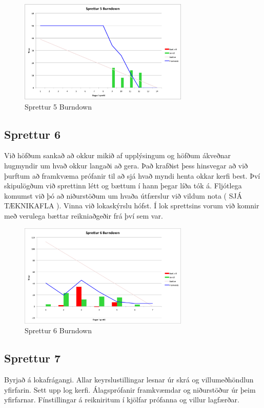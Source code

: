 \documentclass{article}
\begin{document}
\begin{figure}[H]
 \centering
 \includegraphics[width=0.72\textwidth]{Sprettur5_Burndown.png}
 \caption{Sprettur 5 Burndown}
\end{figure}

\subsection{Sprettur 6}
Við höfðum sankað að okkur mikið af upplýsingum og höfðum ákveðnar hugmyndir um hvað okkur langaði að gera. Það krafðist þess hinsvegar að við 
þurftum að framkvæma prófanir til að sjá hvað myndi henta okkar kerfi best. Því skipulögðum við sprettinn létt og bættum í hann þegar líða tók á. 
Fljótlega komumst við þó að niðurstöðum um hvaða útfærslur við vildum nota ( SJÁ TÆKNIKAFLA ). Vinna við lokaskýrslu hófst. Í lok sprettsins 
vorum við komnir með verulega bættar reikniaðgeðir frá því sem var.

\begin{figure}[H]
 \centering
 \includegraphics[width=0.72\textwidth]{Sprettur6_Burndown.png}
 \caption{Sprettur 6 Burndown}
\end{figure}

\subsection{Sprettur 7}
Byrjað á lokafrágangi. Allar keyrslustillingar lesnar úr skrá og villumeðhöndlun yfirfarin. Sett upp log kerfi. Álagsprófanir framkvæmdar og 
niðurstöður úr þeim yfirfarnar. Fínstillingar á reikniritum í kjölfar prófanna og villur lagfærðar. 
\end{document}
